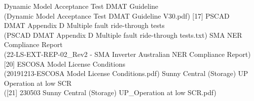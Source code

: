 \begin{thebibliography}{99}
	 Dynamic Model Acceptance Test DMAT Guideline\\
	(Dynamic Model Acceptance Test DMAT Guideline V30.pdf)
	[17] PSCAD DMAT Appendix D Multiple fault ride-through tests\\
	(PSCAD DMAT Appendix D Multiple fault ride-through tests.txt)
	 SMA NER Compliance Report\\
	(22-LS-EXT-REP-02_Rev2 - SMA Inverter Australian NER Compliance Report)
	[20] ESCOSA Model License Conditions\\
	(20191213-ESCOSA Model License Conditions.pdf)
	Sunny Central (Storage) UP Operation at low SCR\\
	([21] 230503 Sunny Central (Storage) UP_Operation at low SCR.pdf)
\end{thebibliography}